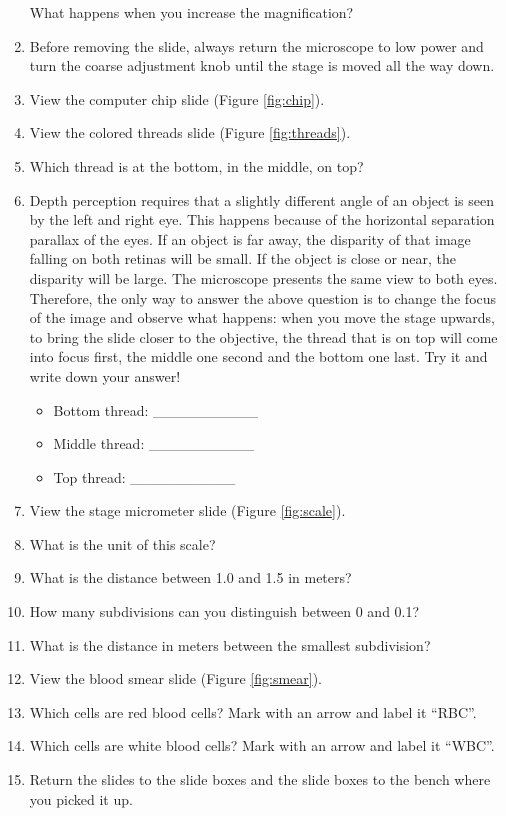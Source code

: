 \documentclass[]{book}
\providecommand{\tightlist}{%
  \setlength{\itemsep}{0pt}\setlength{\parskip}{0pt}}
\begin{document}
\begin{enumerate}
  What happens when you increase the magnification?
\item
  Before removing the slide, always return the microscope to low power and turn the coarse adjustment knob until the stage is moved all the way down.
\item
  View the computer chip slide (Figure \ref{fig:chip}).
\item
  View the colored threads slide (Figure \ref{fig:threads}).
\item
  Which thread is at the bottom, in the middle, on top?
\item
  Depth perception requires that a slightly different angle of an object is seen by the left and right eye. This happens because of the horizontal separation parallax of the eyes. If an object is far away, the disparity of that image falling on both retinas will be small. If the object is close or near, the disparity will be large. The microscope presents the same view to both eyes. Therefore, the only way to answer the above question is to change the focus of the image and observe what happens: when you move the stage upwards, to bring the slide closer to the objective, the thread that is on top will come into focus first, the middle one second and the bottom one last. Try it and write down your answer!

  \begin{itemize}
  \tightlist
  \item
    Bottom thread: \_\_\_\_\_\_\_\_\_\_
  \item
    Middle thread: \_\_\_\_\_\_\_\_\_\_
  \item
    Top thread: \_\_\_\_\_\_\_\_\_\_
  \end{itemize}
\item
  View the stage micrometer slide (Figure \ref{fig:scale}).
\item
  What is the unit of this scale?
\item
  What is the distance between 1.0 and 1.5 in meters?
\item
  How many subdivisions can you distinguish between 0 and 0.1?
\item
  What is the distance in meters between the smallest subdivision?
\item
  View the blood smear slide (Figure \ref{fig:smear}).
\item
  Which cells are red blood cells? Mark with an arrow and label it ``RBC''.
\item
  Which cells are white blood cells? Mark with an arrow and label it ``WBC''.
\item
  Return the slides to the slide boxes and the slide boxes to the bench where you picked it up.
\end{enumerate}
\end{document}
